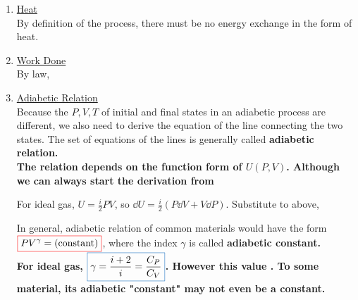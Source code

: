 \documentclass[class=article, crop=false, 12pt]{standalone}
\begin{document}
\begin{enumerate}
    \item \ul{Heat}\\
    By definition of the process, 
    there must be no energy exchange in the form of heat.


    \item \ul{Work Done}\\
    By  law, 


    \item \ul{Adiabetic Relation}\\
    Because the $P,V,T$ of initial and final states in an adiabetic process are different, 
    we also need to derive the equation of the line connecting the two states.
    The set of equations of the lines is generally called \bf{adiabetic relation}.\\

    The relation depends on the function form of $U(P,V)$.
    Although we can always start the derivation from

    For ideal gas, $U = \frac{i}{2}PV$, 
    so $\dd{U} = \frac{i}{2}(P\dd{V} + V\dd{P})$.
    Substitute to above,

    In general, adiabetic relation of common materials would have the form $\cbox[red]{PV^\gamma = (\text{constant})}$,
    where the index $\gamma$ is called \bf{adiabetic constant}. \\

    For ideal gas, $\cbox[blue]{\gamma = \frac{i+2}{i} = \frac{C_P}{C_V}}$.
    However this value . 
    To some material, its adiabetic "constant" may not even be a constant.  


\end{enumerate}
\end{document}
